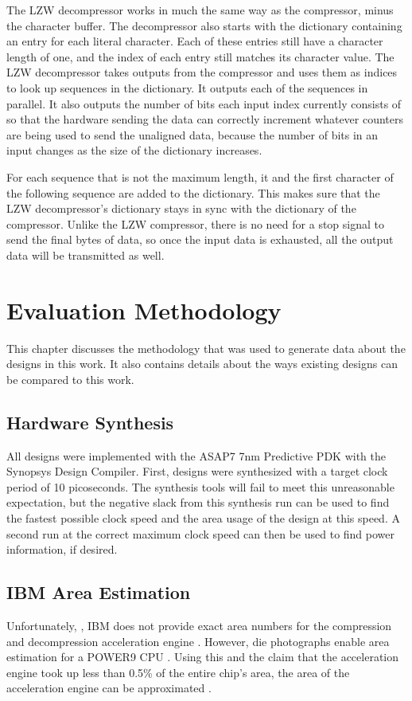 \documentclass[doublespace,nopageskip]{VTthesis}
\begin{document}
The LZW decompressor works in much the same way as the compressor, minus the character buffer. The decompressor also starts with the dictionary containing an entry for each literal character. Each of these entries still have a character length of one, and the index of each entry still matches its character value. The LZW decompressor takes outputs from the compressor and uses them as indices to look up sequences in the dictionary. It outputs each of the sequences in parallel. It also outputs the number of bits each input index currently consists of so that the hardware sending the data can correctly increment whatever counters are being used to send the unaligned data, because the number of bits in an input changes as the size of the dictionary increases.

For each sequence that is not the maximum length, it and the first character of the following sequence are added to the dictionary. This makes sure that the LZW decompressor's dictionary stays in sync with the dictionary of the compressor. Unlike the LZW compressor, there is no need for a stop signal to send the final bytes of data, so once the input data is exhausted, all the output data will be transmitted as well.

\section{Evaluation Methodology}\label{se:methodology}
This chapter discusses the methodology that was used to generate data about the designs in this work. It also contains details about the ways existing designs can be compared to this work.

\subsection{Hardware Synthesis}\label{ss:hardware_synthesis}
All designs were implemented with the ASAP7 7nm Predictive PDK with the Synopsys Design Compiler. First, designs were synthesized with a target clock period of 10 picoseconds. The synthesis tools will fail to meet this unreasonable expectation, but the negative slack from this synthesis run can be used to find the fastest possible clock speed and the area usage of the design at this speed. A second run at the correct maximum clock speed can then be used to find power information, if desired.

\subsection{IBM Area Estimation}\label{ss:ibm_area_estimation}
Unfortunately, , IBM does not provide exact area numbers for the compression and decompression acceleration engine \cite{ibm}. However, die photographs enable area estimation for a POWER9 CPU \cite{wikichip-ibm-area}. Using this and the claim that the acceleration engine took up less than 0.5\% of the entire chip's area, the area of the acceleration engine can be approximated \cite{ibm}.
\end{document}
